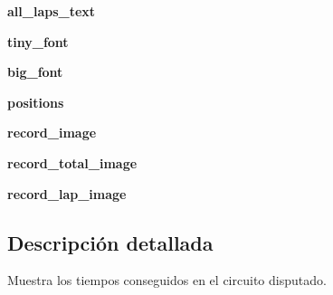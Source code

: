 \begin{DoxyCompactItemize}
\item 
\hypertarget{classengine_1_1classificationmenu_1_1TimedMenu_a126c051942c9122a03ac9d6a8164a7d2}{
{\bfseries all\-\_\-laps\-\_\-text}}
\label{classengine_1_1classificationmenu_1_1TimedMenu_a126c051942c9122a03ac9d6a8164a7d2}

\item 
\hypertarget{classengine_1_1classificationmenu_1_1TimedMenu_ad0d8d4ff0a05ff32cb55575326326cd9}{
{\bfseries tiny\-\_\-font}}
\label{classengine_1_1classificationmenu_1_1TimedMenu_ad0d8d4ff0a05ff32cb55575326326cd9}

\item 
\hypertarget{classengine_1_1classificationmenu_1_1TimedMenu_a65938f977e36229f26f81c128c259532}{
{\bfseries big\-\_\-font}}
\label{classengine_1_1classificationmenu_1_1TimedMenu_a65938f977e36229f26f81c128c259532}

\item 
\hypertarget{classengine_1_1classificationmenu_1_1TimedMenu_afac598b9593b75f47a7795e4826f5ad0}{
{\bfseries positions}}
\label{classengine_1_1classificationmenu_1_1TimedMenu_afac598b9593b75f47a7795e4826f5ad0}

\item 
\hypertarget{classengine_1_1classificationmenu_1_1TimedMenu_a1ea6175ff70a3ddd39b4329bbaef2b96}{
{\bfseries record\-\_\-image}}
\label{classengine_1_1classificationmenu_1_1TimedMenu_a1ea6175ff70a3ddd39b4329bbaef2b96}

\item 
\hypertarget{classengine_1_1classificationmenu_1_1TimedMenu_a7175dcf9b37078d305cf9800af9b003d}{
{\bfseries record\-\_\-total\-\_\-image}}
\label{classengine_1_1classificationmenu_1_1TimedMenu_a7175dcf9b37078d305cf9800af9b003d}

\item 
\hypertarget{classengine_1_1classificationmenu_1_1TimedMenu_a69e22da616cc2dfbc0406c9de9fab75b}{
{\bfseries record\-\_\-lap\-\_\-image}}
\label{classengine_1_1classificationmenu_1_1TimedMenu_a69e22da616cc2dfbc0406c9de9fab75b}

\end{DoxyCompactItemize}


\subsection{\-Descripción detallada}
\-Muestra los tiempos conseguidos en el circuito disputado. 

